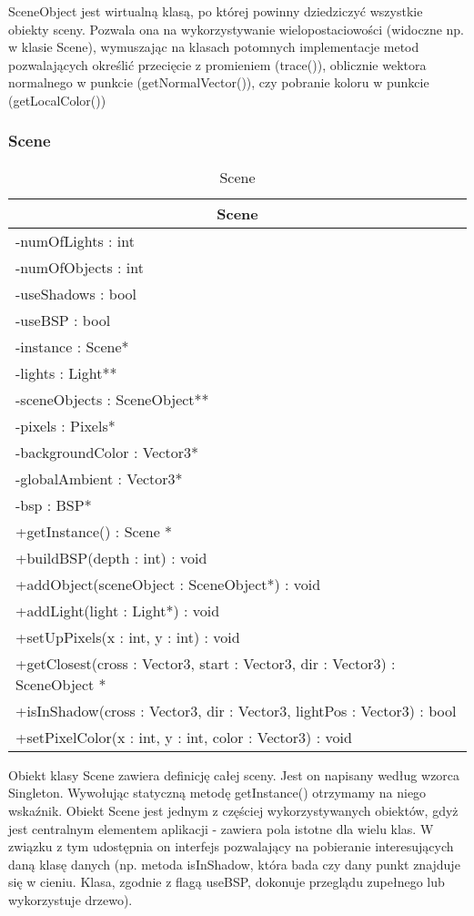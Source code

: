 SceneObject jest wirtualną klasą, po której powinny dziedziczyć wszystkie obiekty sceny. Pozwala ona na wykorzystywanie wielopostaciowości (widoczne np. w klasie Scene), wymuszając na klasach potomnych implementacje metod pozwalających określić przecięcie z promieniem (trace()), oblicznie wektora normalnego w punkcie (getNormalVector()), czy pobranie koloru w punkcie (getLocalColor())

\subsubsection{Scene}

\footnotesize
\begin{longtable}{|p{14cm}|}
    \caption{Scene} \label{tab:Scene} \\ \hline
    \multicolumn{1}{|c|}{Scene} \\ \hline
    -numOfLights : int \\
    -numOfObjects : int \\
    -useShadows : bool \\
    -useBSP : bool \\
    -instance : Scene* \\
    -lights : Light** \\
    -sceneObjects : SceneObject** \\
    -pixels : Pixels* \\
    -backgroundColor : Vector3* \\
    -globalAmbient : Vector3* \\
    -bsp : BSP* \\
    \hline
	+getInstance() : Scene * \\
	+buildBSP(depth : int) : void \\
	+addObject(sceneObject : SceneObject*) : void \\
	+addLight(light : Light*) : void \\
	+setUpPixels(x : int, y : int) : void \\
	+getClosest(cross : Vector3, start : Vector3, dir : Vector3) : SceneObject * \\
	+isInShadow(cross : Vector3, dir : Vector3, lightPos : Vector3) : bool \\
	+setPixelColor(x : int, y : int, color : Vector3) : void \\
	\hline
\end{longtable}
\normalsize

Obiekt klasy Scene zawiera definicję całej sceny. Jest on napisany według wzorca Singleton. Wywołując statyczną metodę getInstance() otrzymamy na niego wskaźnik. Obiekt Scene jest jednym z częściej wykorzystywanych obiektów, gdyż jest centralnym elementem aplikacji - zawiera pola istotne dla wielu klas. W związku z tym udostępnia on interfejs pozwalający na pobieranie interesujących daną klasę danych (np. metoda isInShadow, która bada czy dany punkt znajduje się w cieniu. Klasa, zgodnie z flagą useBSP, dokonuje przeglądu zupełnego lub wykorzystuje drzewo).


